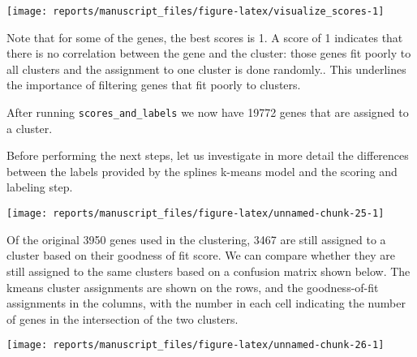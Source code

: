 \documentclass[9pt,a4paper,]{extarticle}
\newenvironment{Shaded}{\begin{snugshade}}{\end{snugshade}}
\newcommand{\CommentTok}[1]{\textcolor[rgb]{0.56,0.35,0.01}{\textit{#1}}}
\newcommand{\KeywordTok}[1]{\textcolor[rgb]{0.13,0.29,0.53}{\textbf{#1}}}
\newcommand{\NormalTok}[1]{#1}
\newcommand{\OperatorTok}[1]{\textcolor[rgb]{0.81,0.36,0.00}{\textbf{#1}}}
\newcommand{\StringTok}[1]{\textcolor[rgb]{0.31,0.60,0.02}{#1}}
\begin{document}
\begin{center}\texttt{[image: reports/manuscript\_files/figure-latex/visualize\_scores-1]} \end{center}

Note that for some of the genes, the best scores is 1. A score of 1 indicates
that there is no correlation between the gene and the cluster: those genes fit
poorly to all clusters and the assignment to one cluster is done randomly..
This underlines the importance of filtering genes that fit poorly to clusters.

\begin{Shaded}
\end{Shaded}

After running \texttt{scores\_and\_labels} we now have 19772 genes that
are assigned to a cluster.

Before performing the next steps, let us investigate in more detail the
differences between the labels provided by the splines k-means model and the
scoring and labeling step.

\begin{center}\texttt{[image: reports/manuscript\_files/figure-latex/unnamed-chunk-25-1]} \end{center}

Of the original 3950 genes used in the
clustering, 3467 are still assigned to a cluster based on their goodness of
fit score. We can compare whether they are still assigned to the same clusters
based on a confusion matrix shown below. The kmeans cluster assignments are
shown on the rows, and the goodness-of-fit assignments in the columns, with
the number in each cell indicating the number of genes in the intersection of
the two clusters.

\begin{center}\texttt{[image: reports/manuscript\_files/figure-latex/unnamed-chunk-26-1]} \end{center}
\end{document}
